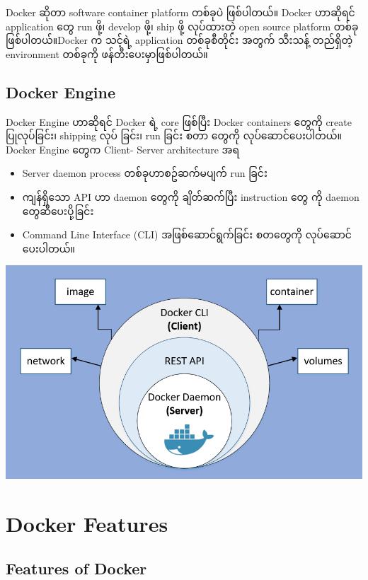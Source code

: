 Docker ဆိုတာ software container platform တစ်ခုပဲ ဖြစ်ပါတယ်။ Docker
ဟာဆိုရင် application ​တွေ run ဖို့၊ develop ဖို့၊ ship ဖို့ လုပ်ထားတဲ့
open source platform တစ်ခုဖြစ်ပါတယ်။Docker က သင့်ရဲ့ application
တစ်ခုစီတိုင်း အတွက် သီးသန့် တည်ရှိတဲ့ environment တစ်ခုကို
ဖန်တီး​ပေးမှာဖြစ်ပါတယ်။

\hypertarget{docker-engine-1}{%
\subsection{Docker Engine}\label{docker-engine-1}}

Docker Engine ဟာဆိုရင် Docker ရဲ့ core ဖြစ်ပြီး Docker containers
​တွေကို create ပြုလုပ်​ခြင်း၊ shipping လုပ် ခြင်း၊ run ခြင်း စတာ ​တွေကို
လုပ်​ဆောင်​ပေးပါတယ်။ Docker Engine ​တွေက Client- Server architecture အရ

\begin{itemize}
\tightlist
\item
  Server daemon process တစ်ခုဟာစဥ်ဆက်မပျက် run ခြင်း
\item
  ကျန်ရှိ​သော API ဟာ daemon ​တွေကို ချိတ်ဆက်ပြီး instruction ​တွေ ကို
  daemon ​တွေဆီ ​ပေးပို့ခြင်း
\item
  Command Line Interface (CLI) အဖြစ်​ဆောင်ရွက်ခြင်း စတ​တွေကို
  လုပ်​ဆောင်​ပေးပါတယ်။
\end{itemize}

\includegraphics{.gitbook/assets/screenshot-129.png}

\pagebreak

\hypertarget{docker-features-1}{%
\section{Docker Features}\label{docker-features-1}}

\hypertarget{features-of-docker-1}{%
\subsection{Features of Docker}\label{features-of-docker-1}}

